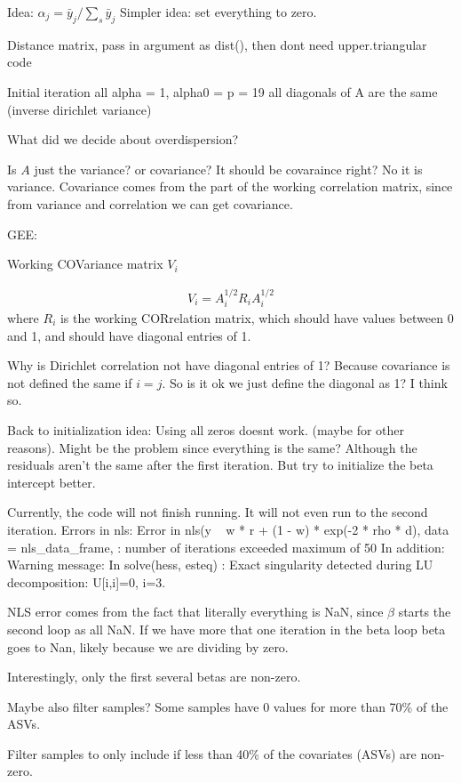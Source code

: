 \documentclass[10pt]{article}
\begin{document}
Idea: $\alpha_j = \bar y_j/ \sum_s \bar y_j$
Simpler idea: set everything to zero.

Distance matrix, pass in argument as dist(), then dont need upper.triangular code

Initial iteration
all alpha = 1, alpha0 = p = 19
all diagonals of A are the same (inverse dirichlet variance)

What did we decide about overdispersion?

Is $A$ just the variance? or covariance? It should be covaraince right? No it is variance. Covariance comes from the part of the working correlation matrix, since from variance and correlation we can get covariance.


GEE:

Working COVariance matrix $V_i$

\begin{align*}
  V_i = A_i^{1/2}R_i A_i^{1/2}
\end{align*}
where $R_i$ is the working CORrelation matrix, which should have values between 0 and 1, and should have diagonal entries of 1.


Why is Dirichlet correlation not have diagonal entries of 1? Because covariance is not defined the same if $i = j$. So is it ok we just define the diagonal as 1? I think so.


Back to initialization idea: Using all zeros doesnt work. (maybe for other reasons). Might be the problem since everything is the same? Although the residuals aren't the same after the first iteration. But try to initialize the beta intercept better.


Currently, the code will not finish running. It will not even run to the second iteration. Errors in nls:
Error in nls(y ~ w * r + (1 - w) * exp(-2 * rho * d), data = nls\_data\_frame,  :
  number of iterations exceeded maximum of 50
In addition: Warning message:
In solve(hess, esteq) :
  Exact singularity detected during LU decomposition: U[i,i]=0, i=3.


NLS error comes from the fact that literally everything is NaN, since $\beta$ starts the second loop as all NaN.
If we have more that one iteration in the beta loop beta goes to Nan, likely because we are dividing by zero.

Interestingly, only the first several betas are non-zero.


Maybe also filter samples? Some samples have 0 values for more than 70\% of the ASVs.

Filter samples to only include if less than 40\% of the covariates (ASVs) are non-zero.
\end{document}
